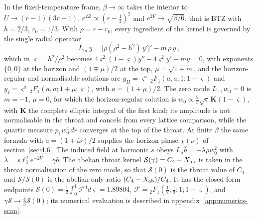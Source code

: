 In the fixed-temperature frame, $\beta \to \infty$
takes the interior to $U \to (r - 1)(3r + 1)$, $e^{2Z} \propto (r - \tfrac13)^2$
and $e^{2V} \to \sqrt{\beta/6}$, that is BTZ with $h = 2/3$, $r_0 = 1/3$. With $\rho = r - r_0$, every ingredient of the kernel is governed
by the single radial operator
\begin{equation}
L_m\,y = \big[\rho(\rho^2 - h^2)\,y'\big]' - m\,\rho\,y~,
\end{equation}
which in $\varsigma = h^2/\rho^2$ becomes
$4\varsigma^2(1-\varsigma)y'' - 4\varsigma^2y' - my = 0$, with exponents
$\{0, 0\}$ at the horizon and $(1 \mp \mu)/2$ at the top, $\mu = \sqrt{1+m}$,
and the horizon-regular and normalisable solutions are
$y_H = \varsigma^a\,{}_2F_1(a, a; 1; 1 - \varsigma)$ and $y_I = \varsigma^a\,{}_2F_1(a, a; 1 + \mu; \varsigma)$,
with $a = (1+\mu)/2$. The zero mode $L_{-1}w_0 = 0$ is $m = -1$, $\mu = 0$,
for which the horizon-regular solution is
$w_0 \propto \tfrac{2}{\pi}\sqrt{\varsigma}\,\mathbf{K}(1 - \varsigma)$, with
$\mathbf{K}$ the complete elliptic integral of the first kind; its amplitude
is not normalisable in the throat and cancels from every lattice comparison,
while the quartic measure $p_1 w_0^4\,dr$ converges at the top of the throat.
At finite $\beta$ the same formula
with $a = (1 + i\nu)/2$ supplies the horizon phase $\chi(\nu)$ of section~\ref{sec:4.6}.
The induced field at harmonic $s$ obeys $L_\lambda\hat b = -\lambda\rho
w_0^2$ with $\lambda = s\ell_3^2 e^{-2V} = \gamma b$. The abelian throat
kernel $\mathcal{S}(\gamma) = C_4 - X_{\rm ab}$ is taken in the throat
normalisation of the zero mode, so that $\mathcal{S}(0)$ is the throat value
of $C_4$ and $\mathcal{S}/\mathcal{S}(0)$ is the abelian-only ratio
$(C_4 - X_{\rm ab})/C_4$. It has
the closed-form endpoints $\mathcal{S}(0) = \tfrac12
\int_0^1 \mathcal{F}^4 d\varsigma = 1.89804$, $\mathcal{F} = {}_2F_1(\tfrac12, \tfrac12; 1; 1 - \varsigma)$, and
$\gamma\mathcal{S} \to \tfrac43\mathcal{S}(0)$; its numerical evaluation is
described in appendix~\ref{app:numerics-scan}.

